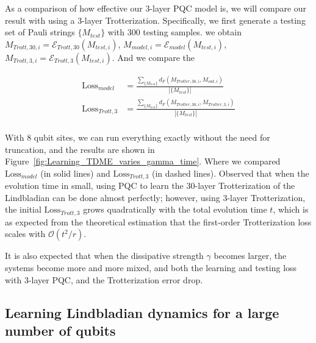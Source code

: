 \documentclass[%
 reprint,
superscriptaddress,
 amsmath,amssymb,
 aps,
]{revtex4-2}
\newcommand{\E}{\mathcal{E}}
\begin{document}
As a comparison of how effective our $3$-layer PQC model is, we will compare our result with using a $3$-layer Trotterization. Specifically, we first generate a testing set of Pauli strings $\{M_{test}\}$ with 300 testing samples. we obtain $M_{Trott,30, i} = \E_{Trott, 30}(M_{test, i})$, $M_{model, i} = \E_{model}(M_{test, i})$, $M_{Trott,3, i} = \E_{Trott, 3}(M_{test, i})$. And we compare the 

\begin{equation}
\begin{split}
    \text{Loss}_{model}&=\frac{\sum_{\{M_{test}\}}d_F(M_{Trotter, 30, i}, M_{out, i})}{|\{M_{test}\}|}\\
    \text{Loss}_{Trott, 3}&=\frac{\sum_{\{M_{test}\}}d_F(M_{Trotter, 30, i}, M_{Trotter, 3, i})}{|\{M_{test}\}|}\\
\end{split}
\end{equation}

With 8 qubit sites, we can run everything exactly without the need for truncation, and the results are shown in Figure~\ref{fig:Learning_TDME_varies_gamma_time}. Where we compared $\text{Loss}_{model}$ (in solid lines) and $\text{Loss}_{Trott, 3}$ (in dashed lines). Observed that when the evolution time in small, using PQC to learn the 30-layer Trotterization of the Lindbladian can be done almost perfectly; however, using 3-layer Trotterization, the initial $\text{Loss}_{Trott, 3}$ grows quadratically with the total evolution time $t$, which is as expected from the theoretical estimation that the first-order Trotterization loss scales with $\mathcal{O}(t^2/r)$.

It is also expected that when the dissipative strength $\gamma$ becomes larger, the systems become more and more mixed, and both the learning and testing loss with 3-layer PQC, and the Trotterization error drop.

\subsection{Learning Lindbladian dynamics for a large number of qubits}
\label{subsec:Learning_Lindbladian_large_N}

\end{document}
